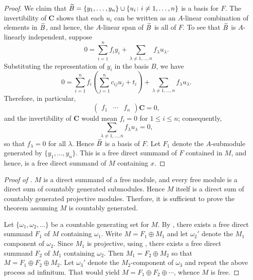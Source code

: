 \begin{proof}
    We claim that $\widetilde{B} = \{y_1,\dots,y_n\}\cup\{u_i\colon i\ne 1,\dots,n\}$ is a basis for $F$. The invertibility of $\mathbf C$ shows that each $u_i$ can be written as an $A$-linear combination of elements in $\widetilde{B}$, and hence, the $A$-linear span of $\widetilde{B}$ is all of $F$. To see that $\widetilde{B}$ is $A$-linearly independent, suppose 
    \begin{equation*}
        0 = \sum_{i = 1}^n f_iy_i + \sum_{\lambda\ne 1,\dots,n} f_\lambda u_\lambda.
    \end{equation*}
    Substituting the representation of $y_i$ in the basis $B$, we have 
    \begin{equation*}
        0 = \sum_{i = 1}^n f_i\left(\sum_{j = 1}^n c_{ij}u_j + t_i\right) + \sum_{\lambda\ne 1,\dots, n}f_\lambda u_\lambda.
    \end{equation*}
    Therefore, in particular, 
    \begin{equation*}
        \begin{pmatrix}
            f_1 & \cdots & f_n
        \end{pmatrix}\mathbf C = 0,
    \end{equation*}
    and the invertibility of $\mathbf C$ would mean $f_i = 0$ for $1\le i\le n$; consequently, 
    \begin{equation*}
        \sum_{\lambda\ne 1,\dots, n} f_\lambda u_\lambda = 0,
    \end{equation*}
    so that $f_\lambda = 0$ for all $\lambda$. Hence $\widetilde{B}$ is a basis of $F$. Let $F_1$ denote the $A$-submodule generated by $\{y_1,\dots,y_n\}$. This is a free direct summand of $F$ contained in $M$, and hence, is a free direct summand of $M$ containing $x$.
\end{proof}

\begin{proof}[Proof of ]
    $M$ is a direct summand of a free module, and every free module is a direct sum of countably generated submodules. Hence $M$ itself is a direct sum of countably generated projective modules. Therfore, it is sufficient to prove the theorem assuming $M$ is countably generated. 

    Let $\{\omega_1,\omega_2,\dots\}$ be a countable generating set for $M$. By , there exists a free direct summand $F_1$ of $M$ containing $\omega_1$. Write $M = F_1\oplus M_1$ and let $\omega_2'$ denote the $M_1$ component of $\omega_2$. Since $M_1$ is projective, using , there exists a free direct summand $F_2$ of $M_1$ containing $\omega_2$. Then $M_1 = F_2\oplus M_2$ so that $M = F_1\oplus F_2\oplus M_2$. Let $\omega_3'$ denote the $M_2$-component of $\omega_3$ and repeat the above process ad infinitum. That would yield $M = F_1\oplus F_2\oplus\cdots$, whence $M$ is free.
\end{proof}